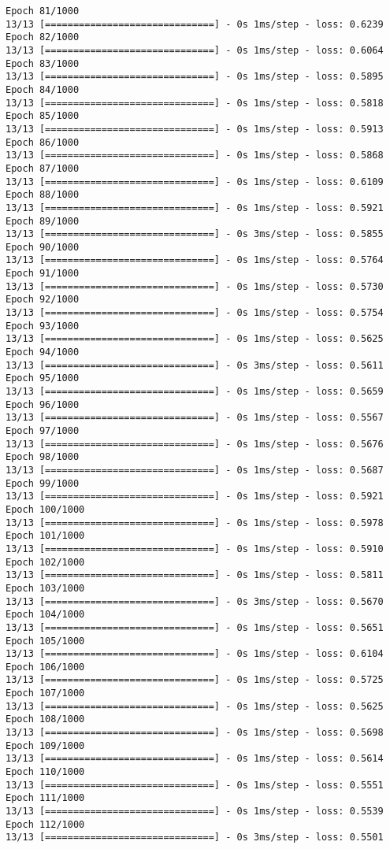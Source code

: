 \documentclass[11pt]{article}
\begin{document}
\begin{Verbatim}[commandchars=\\\{\}]
Epoch 81/1000
13/13 [==============================] - 0s 1ms/step - loss: 0.6239
Epoch 82/1000
13/13 [==============================] - 0s 1ms/step - loss: 0.6064
Epoch 83/1000
13/13 [==============================] - 0s 1ms/step - loss: 0.5895
Epoch 84/1000
13/13 [==============================] - 0s 1ms/step - loss: 0.5818
Epoch 85/1000
13/13 [==============================] - 0s 1ms/step - loss: 0.5913
Epoch 86/1000
13/13 [==============================] - 0s 1ms/step - loss: 0.5868
Epoch 87/1000
13/13 [==============================] - 0s 1ms/step - loss: 0.6109
Epoch 88/1000
13/13 [==============================] - 0s 1ms/step - loss: 0.5921
Epoch 89/1000
13/13 [==============================] - 0s 3ms/step - loss: 0.5855
Epoch 90/1000
13/13 [==============================] - 0s 1ms/step - loss: 0.5764
Epoch 91/1000
13/13 [==============================] - 0s 1ms/step - loss: 0.5730
Epoch 92/1000
13/13 [==============================] - 0s 1ms/step - loss: 0.5754
Epoch 93/1000
13/13 [==============================] - 0s 1ms/step - loss: 0.5625
Epoch 94/1000
13/13 [==============================] - 0s 3ms/step - loss: 0.5611
Epoch 95/1000
13/13 [==============================] - 0s 1ms/step - loss: 0.5659
Epoch 96/1000
13/13 [==============================] - 0s 1ms/step - loss: 0.5567
Epoch 97/1000
13/13 [==============================] - 0s 1ms/step - loss: 0.5676
Epoch 98/1000
13/13 [==============================] - 0s 1ms/step - loss: 0.5687
Epoch 99/1000
13/13 [==============================] - 0s 1ms/step - loss: 0.5921
Epoch 100/1000
13/13 [==============================] - 0s 1ms/step - loss: 0.5978
Epoch 101/1000
13/13 [==============================] - 0s 1ms/step - loss: 0.5910
Epoch 102/1000
13/13 [==============================] - 0s 1ms/step - loss: 0.5811
Epoch 103/1000
13/13 [==============================] - 0s 3ms/step - loss: 0.5670
Epoch 104/1000
13/13 [==============================] - 0s 1ms/step - loss: 0.5651
Epoch 105/1000
13/13 [==============================] - 0s 1ms/step - loss: 0.6104
Epoch 106/1000
13/13 [==============================] - 0s 1ms/step - loss: 0.5725
Epoch 107/1000
13/13 [==============================] - 0s 1ms/step - loss: 0.5625
Epoch 108/1000
13/13 [==============================] - 0s 1ms/step - loss: 0.5698
Epoch 109/1000
13/13 [==============================] - 0s 1ms/step - loss: 0.5614
Epoch 110/1000
13/13 [==============================] - 0s 1ms/step - loss: 0.5551
Epoch 111/1000
13/13 [==============================] - 0s 1ms/step - loss: 0.5539
Epoch 112/1000
13/13 [==============================] - 0s 3ms/step - loss: 0.5501

\end{Verbatim}
\end{document}
